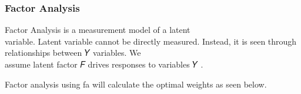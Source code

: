 \documentclass[
]{article}
\newenvironment{Shaded}{\begin{snugshade}}{\end{snugshade}}
\newcommand{\AttributeTok}[1]{\textcolor[rgb]{0.13,0.29,0.53}{#1}}
\newcommand{\DecValTok}[1]{\textcolor[rgb]{0.00,0.00,0.81}{#1}}
\newcommand{\FunctionTok}[1]{\textcolor[rgb]{0.13,0.29,0.53}{\textbf{#1}}}
\newcommand{\NormalTok}[1]{#1}
\newcommand{\OtherTok}[1]{\textcolor[rgb]{0.56,0.35,0.01}{#1}}
\newcommand{\SpecialCharTok}[1]{\textcolor[rgb]{0.81,0.36,0.00}{\textbf{#1}}}
\newcommand{\StringTok}[1]{\textcolor[rgb]{0.31,0.60,0.02}{#1}}
\begin{document}
\hypertarget{factor-analysis}{%
\subsubsection{Factor Analysis}\label{factor-analysis}}

Factor Analysis is a measurement model of a latent\\
variable. Latent variable cannot be directly measured. Instead, it is
seen through\\
relationships between 𝑌 variables. We\\
assume latent factor 𝐹 drives responses to variables 𝑌 .\\

\begin{Shaded}
\end{Shaded}

Factor analysis using fa will calculate the optimal weights as seen
below.
\end{document}

